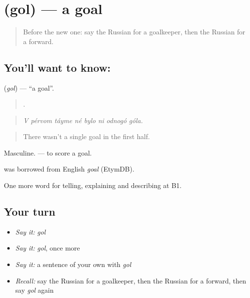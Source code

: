 \section[\texorpdfstring{\ru{гол} (gol)}{гол (gol)}]{ (gol) — a goal}

\label{lesson:RU-C509-gol}



\begin{quote}
Before the new one: say the Russian for a goalkeeper, then the Russian for a forward.
\end{quote}

\subsection*{You'll want to know: }
\textbf{} (\emph{gol}) — \textquotedblleft{}a goal\textquotedblright{}.

\begin{quote}
       .
\end{quote}

\begin{quote}
\emph{V pérvom táyme né bylo ni odnogó góla.}
\end{quote}

\begin{quote}
There wasn't a single goal in the first half.
\end{quote}

Masculine. \emph{ } — to score a goal.

\begin{cousinweb}
\emph{} was borrowed from English \emph{goal} (EtymDB).
\end{cousinweb}

\begin{grammarlens}[title={What you've built}]
One more word for telling, explaining and describing at B1.
\end{grammarlens}

\subsection*{Your turn}
\begin{itemize}
\raggedright
  \item \emph{Say it:} \emph{gol}
  \item \emph{Say it:} \emph{gol}, once more
  \item \emph{Say it:} a sentence of your own with \emph{gol}
  \item \emph{Recall:} say the Russian for a goalkeeper, then the Russian for a forward, then say \emph{gol} again
\end{itemize}

